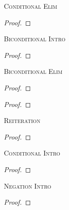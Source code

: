 \begin{multicols}{2}
\newpage %

\noindent\textsc{Conditional Elim}

\begin{proof}
	 
\end{proof}
\bigskip


\noindent\textsc{Biconditional Intro}

\begin{proof}
	 
	\end{proof}
\bigskip


\noindent\textsc{Biconditional Elim}

\begin{proof}
	 
\end{proof}

\begin{proof}
	 
\end{proof}
\bigskip


\noindent\textsc{Reiteration}

\begin{proof}
	 
\end{proof}





\vfill\null
\columnbreak


\noindent\textsc{Conditional Intro}

\nopagebreak
\begin{proof}
	\open
		 \as{}
	\close
	 
\end{proof}
\bigskip



\noindent\textsc{Negation Intro}

\begin{proof}
	\open
		 \as{}
	\close
	 
\end{proof}
\bigskip



\end{multicols}
